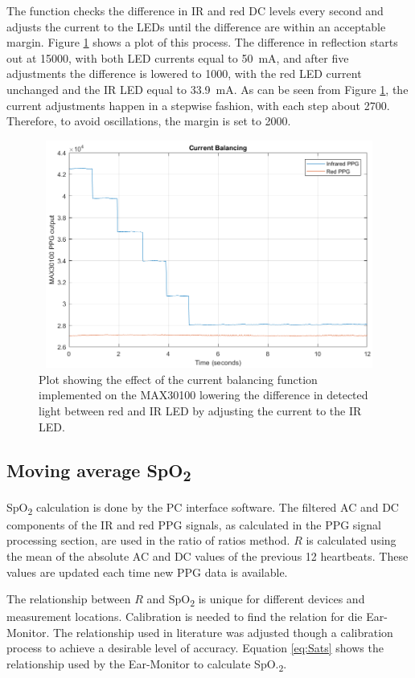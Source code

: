 The function checks the difference in IR and red DC levels every second and adjusts the current to the LEDs until the difference are within an acceptable margin. Figure \ref{fig:CurrentBalancing} shows a plot of this process. The difference in reflection starts out at 15000, with both LED currents equal to \SI{50}{\milli\ampere}, and after five adjustments the difference is lowered to 1000, with the red LED current unchanged and the IR LED equal to \SI{33.9}{\milli\ampere}. As can be seen from Figure \ref{fig:CurrentBalancing}, the current adjustments happen in a stepwise fashion, with each step about 2700. Therefore, to avoid oscillations, the margin is set to 2000.

\begin{figure}[H]
   \centering
   \includegraphics[width=12cm,height=7.5cm]{figs/CurrentBalancing.png}
   \caption{Plot showing the effect of the current balancing function implemented on the MAX30100 lowering the difference in detected light between red and IR LED by adjusting the current to the IR LED.}
   \label{fig:CurrentBalancing}
\end{figure}

\subsection{Moving average SpO\textsubscript{2}}
SpO\textsubscript{2} calculation is done by the PC interface software. The filtered AC and DC components of the IR and red PPG signals, as calculated in the PPG signal processing section, are used in the ratio of ratios method. $R$ is calculated using the mean of the absolute AC and DC values of the previous 12 heartbeats. These values are updated each time new PPG data is available.

\medskip

The relationship between $R$ and SpO\textsubscript{2} is unique for different devices and measurement locations. Calibration is needed to find the relation for die Ear-Monitor. The relationship used in literature \citep{ti2012application} was adjusted though a calibration process to achieve a desirable level of accuracy. Equation \ref{eq:Sats} shows the relationship used by the Ear-Monitor to calculate SpO.\textsubscript{2}.

